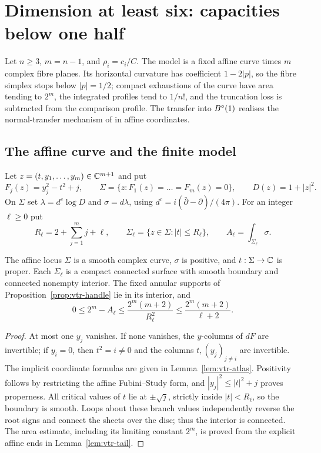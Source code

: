 \section{Dimension at least six: capacities below one half}\label{sec:qdr}

Let $n\ge3$, $m=n-1$, and $\rho_i=c_i/C$. The model is a fixed affine curve times $m$ complex fibre planes. Its horizontal curvature
has coefficient $1-2|p|$, so the fibre simplex stops below $|p|=1/2$; compact exhaustions of the curve have area tending to $2^m$,
the integrated profiles tend to $1/n!$, and the truncation loss is subtracted from the comparison profile. The transfer into
$B^{\circ}(1)$ realises the normal-transfer mechanism of \cite{OpenAI2026} in affine coordinates.

\subsection{The affine curve and the finite model}

\begin{definition}\label{def:qdr-curve}
Let $z=(t,y_1,\dots,y_m)\in\mathbb{C}^{m+1}$ and put
\[
 F_j(z)=y_j^2-t^2+j,\qquad
 \Sigma=\{z:F_1(z)=\dots=F_m(z)=0\},\qquad
 D(z)=1+|z|^2.
\]
On $\Sigma$ set $\lambda=d^c\log D$ and $\sigma=d\lambda$, using $d^c=i(\bar\partial-\partial)/(4\pi)$. For an integer $\ell\ge0$
put
\[
 R_\ell=2+\sum_{j=1}^m j+\ell,\qquad \Sigma_\ell=\{z\in\Sigma:|t|\le R_\ell\},\qquad
 A_\ell=\int_{\Sigma_\ell}\sigma.
\]
\end{definition}

\begin{lemma}\label{lem:qdr-curve}
The affine locus $\Sigma$ is a smooth complex curve, $\sigma$ is positive, and $t:\Sigma\to\mathbb{C}$ is proper. Each $\Sigma_\ell$ is a
compact connected surface with smooth boundary and connected nonempty interior. The fixed annular supports of
Proposition~\ref{prop:vtr-handle} lie in its interior, and
\[
 0\le2^m-A_\ell\le\frac{2^m(m+2)}{R_\ell^2}\le\frac{2^m(m+2)}{\ell+2}.
\]
\end{lemma}

\begin{proof}
At most one $y_j$ vanishes. If none vanishes, the $y$-columns of $dF$ are invertible; if $y_i=0$, then $t^2=i\ne0$ and the columns
$t,(y_j)_{j\ne i}$ are invertible. The implicit coordinate formulas are given in Lemma~\ref{lem:vtr-atlas}. Positivity follows by
restricting the affine Fubini--Study form, and $|y_j|^2\le|t|^2+j$ proves properness. All critical values of $t$ lie at $\pm\sqrt
j$, strictly inside $|t|<R_\ell$, so the boundary is smooth. Loops about these branch values independently reverse the root signs
and connect the sheets over the disc; thus the interior is connected. The area estimate, including its limiting constant $2^m$, is
proved from the explicit affine ends in Lemma~\ref{lem:vtr-tail}.
\end{proof}

